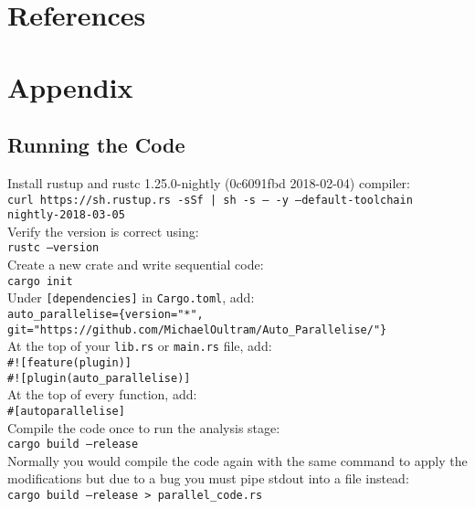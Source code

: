 \chapter{References}
\printbibliography[heading=none]

\chapter{Appendix}

\section{Running the Code}
\label{sec:running-the-code}
Install rustup and rustc 1.25.0-nightly (0c6091fbd 2018-02-04) compiler: \\
\texttt{curl https://sh.rustup.rs -sSf | sh -s -- -y --default-toolchain nightly-2018-03-05} \\

Verify the version is correct using: \\
\texttt{rustc --version} \\

Create a new crate and write sequential code: \\
\texttt{cargo init} \\

Under \texttt{[dependencies]} in \texttt{Cargo.toml}, add: \\
\texttt{auto\_parallelise=\{version="*", git="https://github.com/MichaelOultram/Auto\_Parallelise/"\}} \\

At the top of your \texttt{lib.rs} or \texttt{main.rs} file, add: \\
\texttt{\#![feature(plugin)]} \\
\texttt{\#![plugin(auto\_parallelise)]} \\

At the top of every function, add: \\
\texttt{\#[autoparallelise]} \\

Compile the code once to run the analysis stage: \\
\texttt{cargo build --release} \\

Normally you would compile the code again with the same command to apply the modifications but due to a bug you must pipe stdout into a file instead:\\
\texttt{cargo build --release > parallel\_code.rs} \\

